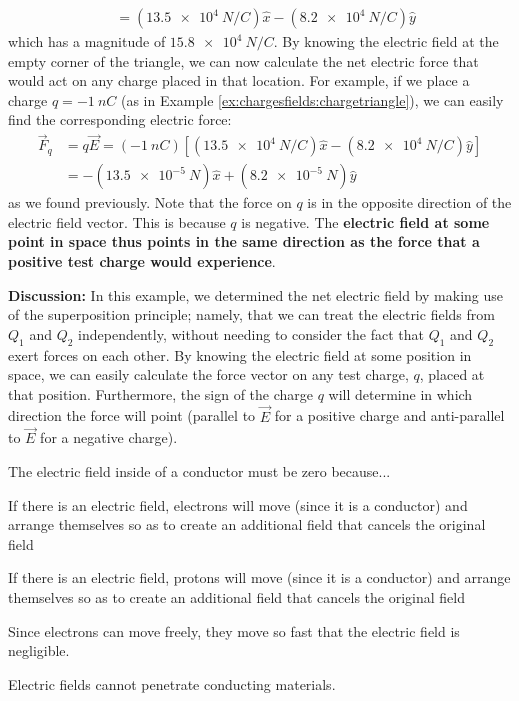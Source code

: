 \begin{example}
\begin{align*}
&=(\SI{13.5e4}{N/C})\hat x-(\SI{8.2e4}{N/C})\hat y
\end{align*}
which has a magnitude of $\SI{15.8e4}{N/C}$. By knowing the electric field at the empty corner of the triangle, we can now calculate the net electric force that would act on any charge placed in that location. For example, if we place a charge $q=\SI{-1}{nC}$ (as in Example \ref{ex:chargesfields:chargetriangle}), we can easily find the corresponding electric force:
\begin{align*}
\vec F_q &= q\vec E=(\SI{-1}{nC})\left[ (\SI{13.5e4}{N/C})\hat x-(\SI{8.2e4}{N/C})\hat y \right]\\
&=-(\SI{13.5e-5}{N})\hat x+(\SI{8.2e-5}{N})\hat y
\end{align*}
as we found previously. Note that the force on $q$ is in the opposite direction of the electric field vector. This is because $q$ is negative. The \textbf{electric field at some point in space thus points in the same direction as the force that a positive test charge would experience}.

\textbf{Discussion:} In this example, we determined the net electric field by making use of the superposition principle; namely, that we can treat the electric fields from $Q_1$ and $Q_2$ independently, without needing to consider the fact that $Q_1$ and $Q_2$ exert forces on each other. By knowing the electric field at some position in space, we can easily calculate the force vector on any test charge, $q$, placed at that position. Furthermore, the sign of the charge $q$ will determine in which direction the force will point (parallel to $\vec E$ for a positive charge and anti-parallel to $\vec E$ for a negative charge).
\end{example}

\begin{checkpoint}\label{cp:chargesfields:conductorield}
	\begin{MCquestion}{The electric field inside of a conductor must be zero because...}
		\item If there is an electric field, electrons will move (since it is a conductor) and arrange themselves so as to create an additional field that cancels the original field \correct
		\item If there is an electric field, protons will move (since it is a conductor) and arrange themselves so as to create an additional field that cancels the original field
		\item Since electrons can move freely, they move so fast that the electric field is negligible.
		\item Electric fields cannot penetrate conducting materials.
	\end{MCquestion}
\end{checkpoint}

